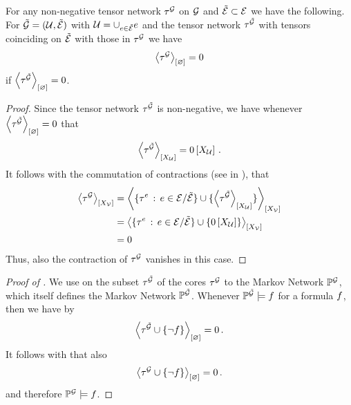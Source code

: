 \begin{lemma}
    \label{lem:monotocityOfVanishingContractions}
    For any non-negative tensor network $\tau^{\mathcal{G}}$ on $\mathcal{G}$ and $\tilde{\mathcal{E}}\subset\mathcal{E}$ we have the following.
    For $\tilde{\mathcal{G}}=(\mathcal{U},\tilde{\mathcal{E}})$ with $\mathcal{U}=\cup_{e\in\tilde{\mathcal{E}}}e$ and the tensor network $\tau^{\tilde{\mathcal{G}}}$ with tensors coinciding on $\tilde{\mathcal{E}}$ with those in $\tau^{\mathcal{G}}$ we have
    \begin{align*}
        \left\langle \tau^{\mathcal{G}}\right\rangle_{\left[ \varnothing \right]} = 0
    \end{align*}
    if $\left\langle \tau^{\tilde{\mathcal{G}}}\right\rangle_{\left[ \varnothing \right]}=0$.
\end{lemma}
\begin{proof}
    Since the tensor network $\tau^{\tilde{\mathcal{G}}}$ is non-negative, we have whenever $\left\langle \tau^{\tilde{\mathcal{G}}}\right\rangle_{\left[ \varnothing \right]}=0$ that
    \begin{align*}
        \left\langle \tau^{\tilde{\mathcal{G}}}\right\rangle_{\left[ X_{\mathcal{U}} \right]} = 0\left[X_{\mathcal{U}}\right] \, .
    \end{align*}
    It follows with the commutation of contractions (see  in ), that
    \begin{align*}
        \left\langle \tau^{\mathcal{G}}\right\rangle_{\left[ X_{\mathcal{V}} \right]}
        &= \left\langle 
            \{\tau^{e} \,:\, e\in\mathcal{E}/\tilde{\mathcal{E}}\}
            \cup \{\left\langle \tau^{\tilde{\mathcal{G}}}\right\rangle_{\left[ X_{\mathcal{U}} \right]}\}
        \right\rangle_{\left[ X_{\mathcal{V}} \right]} \\
        &=    \left\langle 
            \{\tau^{e} \,:\, e\in\mathcal{E}/\tilde{\mathcal{E}}\}
            \cup \{0\left[X_{\mathcal{U}}\right]\}
        \right\rangle_{\left[ X_{\mathcal{V}} \right]} \\
        &= 0
    \end{align*}
    Thus, also the contraction of $\tau^{\mathcal{G}}$ vanishes in this case.
\end{proof}

\begin{proof}[Proof of ]
    We use  on the subset $\tau^{\tilde{\mathcal{G}}}$ of the cores $\tau^{\mathcal{G}}$ to the Markov Network $\mathbb{P}^{\mathcal{G}}$, which itself defines the Markov Network $\mathbb{P}^{\tilde{\mathcal{G}}}$.
    Whenever $\mathbb{P}^{\tilde{\mathcal{G}}}\models f$ for a formula $f$, then we have by 
    \begin{align*}
        \left\langle \tau^{\tilde{\mathcal{G}}} \cup\{\lnot f\}\right\rangle_{\left[ \varnothing \right]} = 0 \, .
    \end{align*}
    It follows with  that also
    \begin{align*}
        \left\langle \tau^{\mathcal{G}} \cup\{\lnot f\}\right\rangle_{\left[ \varnothing \right]} = 0 \, .
    \end{align*}
    and therefore $\mathbb{P}^{\mathcal{G}}\models f$.
\end{proof}


